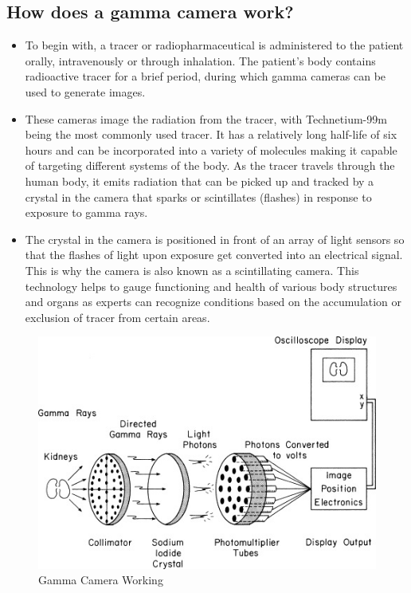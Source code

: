\documentclass{article}
\begin{document}
\subsection{How does a gamma camera work?}
\begin{itemize}
\item To begin with, a tracer or radiopharmaceutical is administered to the patient orally, intravenously or through inhalation. The patient’s body contains radioactive tracer for a brief period, during which gamma cameras can be used to generate images. 
\item These cameras image the radiation from the tracer, with Technetium-99m being the most commonly used tracer. It has a relatively long half-life of six hours and can be incorporated into a variety of molecules making it capable of targeting different systems of the body. As the tracer travels through the human body, it emits radiation that can be picked up and tracked by a crystal in the camera that sparks or scintillates (flashes) in response to exposure to gamma rays.
\item The crystal in the camera is positioned in front of an array of light sensors so that the flashes of light upon exposure get converted into an electrical signal. This is why the camera is also known as a scintillating camera. This technology helps to gauge functioning and health of various body structures and organs as experts can recognize conditions based on the accumulation or exclusion of tracer from certain areas.
\end{itemize}
 \begin{figure}
     \centering
     \includegraphics[scale=0.7]{ezgif.com-gif-maker(2).jpg}
     \caption{Gamma Camera Working}
     \label{fig:gamma camera working}
 \end{figure}
 
\end{document}
